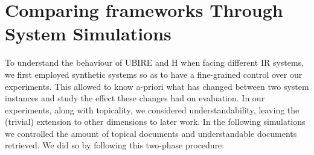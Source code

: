 



\section{Comparing frameworks Through System Simulations}
\label{sec:simulations}


To understand the behaviour of UBIRE and H when facing different IR systems, we first employed synthetic systems so as to have a fine-grained control over our experiments. This allowed to know a-priori what has changed between two system instances and study the effect these changes had on evaluation. In our experiments, along with topicality, we considered understandability, leaving the (trivial) extension to other dimensions to later work. 
In the following simulations we controlled the amount of topical documents and understandable documents retrieved. We did so by following this two-phase procedure:




%

